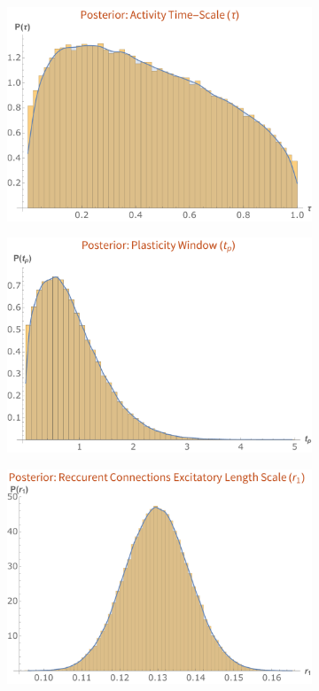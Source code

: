 \begin{figure}[h!]
	\centering
	\begin{subfigure}{0.475\textwidth}
		\centering
		\includegraphics[width=\textwidth]{images/nft_activity/posterior_tau}
		\caption{}
	\end{subfigure}
	\begin{subfigure}{0.475\textwidth}
		\centering
		\includegraphics[width=\textwidth]{images/nft_activity/posterior_tp}
		\caption{}
	\end{subfigure}
	\begin{subfigure}{0.475\textwidth}
		\centering
		\includegraphics[width=\textwidth]{images/nft_activity/posterior_r1}

\end{subfigure}
\end{figure}
